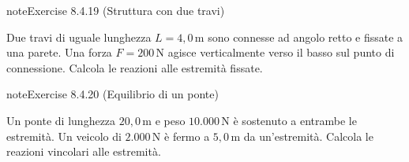 \documentclass[letterpaper,10pt,italian]{jupyterBook}
\begin{document}
\begin{sphinxadmonition}{note}{Exercise 8.4.19 (Struttura con due travi)}



\sphinxAtStartPar
Due travi di uguale lunghezza \(L = 4,0 \, \text{m}\) sono connesse ad angolo retto e fissate a una parete. Una forza \(F = 200 \, \text{N}\) agisce verticalmente verso il basso sul punto di connessione. Calcola le reazioni alle estremità fissate.
\end{sphinxadmonition}
 \label{exercise:ch/mechanics/statics-problems-exercise-19}

\begin{sphinxadmonition}{note}{Exercise 8.4.20 (Equilibrio di un ponte)}



\sphinxAtStartPar
Un ponte di lunghezza \(20,0 \, \text{m}\) e peso \(10.000 \, \text{N}\) è sostenuto a entrambe le estremità. Un veicolo di \(2.000 \, \text{N}\) è fermo a \(5,0 \, \text{m}\) da un’estremità. Calcola le reazioni vincolari alle estremità.
\end{sphinxadmonition}
\end{document}
